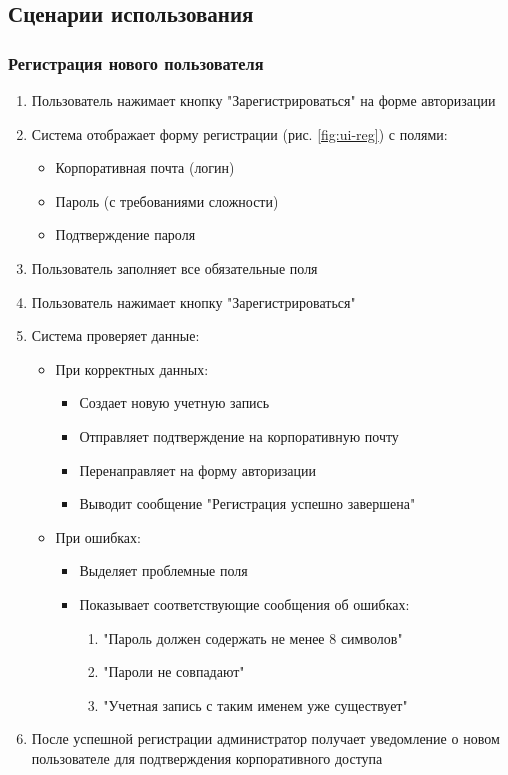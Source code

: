\subsection{Сценарии использования}

\subsubsection{Регистрация нового пользователя}
\begin{enumerate}
	\item Пользователь нажимает кнопку "Зарегистрироваться" на форме авторизации
	\item Система отображает форму регистрации (рис. \ref{fig:ui-reg}) с полями:
	\begin{itemize}
		\item Корпоративная почта (логин)
		\item Пароль (с требованиями сложности)
		\item Подтверждение пароля
	\end{itemize}
	\item Пользователь заполняет все обязательные поля
	\item Пользователь нажимает кнопку "Зарегистрироваться"
	\item Система проверяет данные:
	\begin{itemize}
		\item При корректных данных:
		\begin{itemize}
			\item Создает новую учетную запись
			\item Отправляет подтверждение на корпоративную почту
			\item Перенаправляет на форму авторизации
			\item Выводит сообщение "Регистрация успешно завершена"
		\end{itemize}
		\item При ошибках:
		\begin{itemize}
			\item Выделяет проблемные поля
			\item Показывает соответствующие сообщения об ошибках:
			\begin{enumerate}
				\item "Пароль должен содержать не менее 8 символов"
				\item "Пароли не совпадают"
				\item "Учетная запись с таким именем уже существует"
			\end{enumerate}
		\end{itemize}
	\end{itemize}
	\item После успешной регистрации администратор получает уведомление о новом пользователе для подтверждения корпоративного доступа
\end{enumerate}


